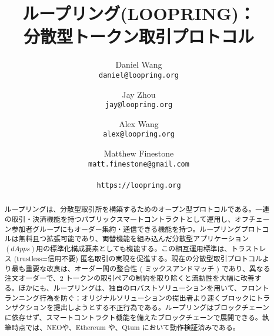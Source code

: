 \documentclass{article}
\title{
{ループリング(LOOPRING)：}\\\textbf{分散型トークン取引プロトコル}}
\author{
  Daniel Wang\\
  \texttt{daniel@loopring.org}\\
  \and
  	Jay Zhou\\
  	\texttt{jay@loopring.org}\\
  	\and
  	Alex Wang\\
  	\texttt{alex@loopring.org}\\
  	\and
  	Matthew Finestone\\
  	\texttt{matt.finestone@gmail.com}\\ 
  \\
  \texttt{https://loopring.org}
 }
\begin{document}
\maketitle


\begin{abstract}
ループリングは、分散型取引所を構築するためのオープン型プロトコルである。一連の取引・決済機能を持つパブリックスマートコントラクトとして運用し、オフチェーン参加者グループにもオーダー集約・通信できる機能を持つ。ループリングプロトコルは無料且つ拡張可能であり、両替機能を組み込んだ分散型アプリケーション$(dApps)$用の標準化構成要素としても機能する。この相互運用標準は、トラストレス (trustless=信用不要) 匿名取引の実現を促進する。現在の分散型取引プロトコルより最も重要な改良は、オーダー間の整合性 ( ミックスアンドマッチ ) であり、異なる注文オーダーで、2 トークンの取引ペアの制約を取り除くと流動性を大幅に改善する。ほかにも、ループリングは、独自のロバストソリューションを用いて、フロントランニング行為を防ぐ：オリジナルソリューションの提出者より速くブロックにトランザクションを提出しようとする不正行為である。ループリングはブロックチェーンに依存せず、スマートコントラクト機能を備えたブロックチェーンで展開できる。執筆時点では、NEO\cite{atterlonn2018distributed}や、Ethereum \cite{buterin2017ethereum} \cite{wood2014ethereum} や、Qtum \cite{dai2017smart} において動作検証済みである。
\end{abstract}
\end{document}
